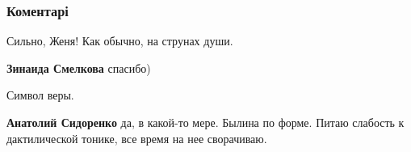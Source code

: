  
 
 
 
 
\subsubsection{Коментарі}
\label{sec:16_08_2021.fb.bilchenko_evgenia.1.zoloto.cmt}

\begin{itemize}
 
Сильно, Женя! Как обычно, на струнах души.

\begin{itemize}
 
\textbf{Зинаида Смелкова} спасибо)
\end{itemize}

 
Символ веры.

\begin{itemize}
 
\textbf{Анатолий Сидоренко} да, в какой-то мере. Былина по форме. Питаю слабость к дактилической тонике, все время на нее сворачиваю.
\end{itemize}

 

\end{itemize}
